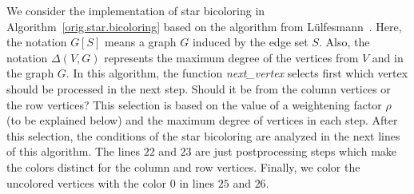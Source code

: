 \documentclass[12pt, twoside,a4paper,toc=bibliography]{scrbook}
\newcommand{\coderef}[1]{Algorithm~\protect\ref{#1}}
\begin{document}
We consider the implementation of star bicoloring in \coderef{orig.star.bicoloring} based on
the algorithm from Lülfesmann~\cite{Lulfesmann2012Fap}.
Here, the notation $G[S]$ means a graph $G$ induced by the edge set $S$.
Also, the notation $\Delta(V,G)$ represents the maximum degree of the vertices from $V$ and in the graph $G$. 
In this algorithm, the function \textit{next\_vertex} selects first which vertex should be processed in the next step.
Should it be from the column vertices or the row vertices?
This selection is based on the value of a weightening factor $\rho$ (to be explained below)
and the maximum degree of vertices in each step.
After this selection, the conditions of the star bicoloring are analyzed in the next lines of this algorithm.
The lines $22$ and $23$ are just postprocessing steps which make the colors distinct for the column and
row vertices. Finally, we color the uncolored vertices with the color $0$ in lines $25$ and $26$.
\end{document}
